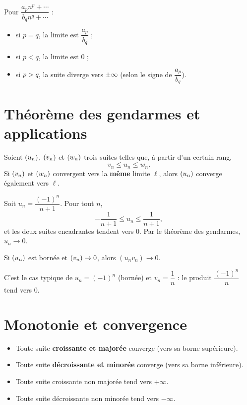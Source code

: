 \documentclass[12pt,a4paper]{article}
\begin{document}
\begin{methodebox}
Pour $\dfrac{a_p n^p + \cdots}{b_q n^q + \cdots}$ :
\begin{itemize}
  \item si $p=q$, la limite est $\dfrac{a_p}{b_q}$ ;
  \item si $p<q$, la limite est $0$ ;
  \item si $p>q$, la suite diverge vers $\pm\infty$ (selon le signe de $\dfrac{a_p}{b_q}$).
\end{itemize}
\end{methodebox}

\section{Théorème des gendarmes et applications}

\begin{theoremebox}
Soient $(u_n)$, $(v_n)$ et $(w_n)$ trois suites telles que, à partir d'un certain rang,
\[
v_n \leq u_n \leq w_n.
\]
Si $(v_n)$ et $(w_n)$ convergent vers la \textbf{même} limite $\ell$, alors $(u_n)$ converge également vers $\ell$.
\end{theoremebox}

\begin{exemplebox}[5.1]
Soit $u_n = \dfrac{(-1)^n}{n+1}$. Pour tout $n$,
\[
-\dfrac{1}{n+1} \leq u_n \leq \dfrac{1}{n+1},
\]
et les deux suites encadrantes tendent vers $0$. Par le théorème des gendarmes, $u_n \to 0$.
\end{exemplebox}

\begin{propbox}
Si $(u_n)$ est bornée et $(v_n) \to 0$, alors $(u_n v_n) \to 0$.
\end{propbox}

C'est le cas typique de $u_n = (-1)^n$ (bornée) et $v_n = \dfrac{1}{n}$ : le produit $\dfrac{(-1)^n}{n}$ tend vers $0$.

\section{Monotonie et convergence}

\begin{theoremebox}
\begin{itemize}
  \item Toute suite \textbf{croissante et majorée} converge (vers sa borne supérieure).
  \item Toute suite \textbf{décroissante et minorée} converge (vers sa borne inférieure).
  \item Toute suite croissante non majorée tend vers $+\infty$.
  \item Toute suite décroissante non minorée tend vers $-\infty$.
\end{itemize}
\end{theoremebox}
\end{document}

